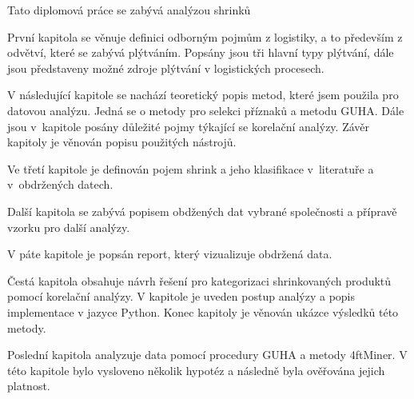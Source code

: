 Tato diplomová práce se zabývá analýzou shrinků 


První kapitola se věnuje definici odborným pojmům z logistiky, a to především z odvětví, které se zabývá plýtváním. Popsány jsou tři hlavní typy plýtvání, dále jsou představeny možné zdroje plýtvání v logistických procesech.

V následující kapitole se nachází teoretický popis metod, které jsem použila pro datovou analýzu. Jedná se o metody pro selekci příznaků a metodu GUHA. Dále jsou v~kapitole posány důležité pojmy týkající se korelační analýzy. Závěr kapitoly je věnován popisu použitých nástrojů.

Ve třetí kapitole je definován pojem shrink a jeho klasifikace v~literatuře a v~obdržených datech.

Další kapitola se zabývá popisem obdžených dat vybrané společnosti a přípravě vzorku pro další analýzy.

V páte kapitole je popsán report, který vizualizuje obdržená data.

Čestá kapitola obsahuje návrh řešení pro kategorizaci shrinkovaných produktů pomocí korelační analýzy. V kapitole je uveden postup analýzy a popis implementace v jazyce Python. Konec kapitoly je věnován ukázce výsledků této metody.

Poslední kapitola analyzuje data pomocí procedury GUHA a metody 4ftMiner. V této kapitole bylo vysloveno několik hypotéz a následně byla ověřována jejich platnost.




